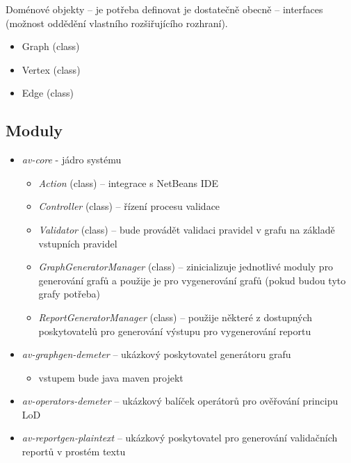 Doménové objekty -- je potřeba definovat je dostatečně obecně -- interfaces (možnost oddědění vlastního rozšiřujícího rozhraní).

\begin{itemize}
\item Graph (class)
\item Vertex (class)
\item Edge (class)
\end{itemize}

\subsection{Moduly}
\begin{itemize}
\item \emph{av-core} - jádro systému
  \begin{itemize}
  \item \emph{Action} (class) -- integrace s NetBeans IDE
  \item \emph{Controller} (class) -- řízení procesu validace
  \item \emph{Validator} (class) -- bude provádět validaci pravidel v grafu na základě vstupních pravidel
  \item \emph{GraphGeneratorManager} (class) -- zinicializuje jednotlivé moduly pro generování grafů a použije je pro vygenerování grafů (pokud budou tyto grafy potřeba)
  \item \emph{ReportGeneratorManager} (class) -- použije některé z dostupných poskytovatelů pro generování výstupu pro vygenerování reportu
  \end{itemize}
\item \emph{av-graphgen-demeter} -- ukázkový poskytovatel generátoru grafu
\begin{itemize}
\item vstupem bude java maven projekt
\end{itemize}
\item \emph{av-operators-demeter} -- ukázkový balíček operátorů pro ověřování principu LoD
\item \emph{av-reportgen-plaintext} -- ukázkový poskytovatel pro generování validačních reportů v prostém textu
\end{itemize}

